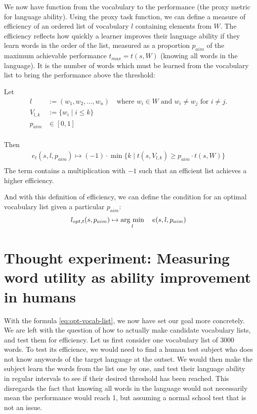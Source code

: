 We now have function from the vocabulary to the performance (the proxy metric for language ability).
Using the proxy task function, we can define a measure of efficiency of an ordered list of vocabulary $l$ containing elements from $W$.
The efficiency reflects how quickly a learner improves their language ability if they learn words in the order of the list, measured as a proportion $p_{aim}$ of the maximum achievable performance $t_{max} = t(s,W)$ (knowing all words in the language).
It is the number of words which must be learned from the vocabulary list to bring the performance above the threshold:

Let
\begin{align*}
	l & := (w_1, w_2, \dots, w_n) \quad \text{where } w_i \in W \text{ and } w_i \neq w_j \text{ for } i \neq j. \\
	V_{l, k} &:= \{w_i \mid i \leq k\}\\
	p_{aim} & \in  [0, 1] \\
\end{align*}

Then 
\begin{align*}
	e_{t}(s, l, p_{aim}) \mapsto ( -1 )  \cdot  \min\{ k \mid  t(s,  V_{l, k}) \geq p_{aim} \cdot t(s, W)\} \\
\end{align*}
The term contains a multiplication with $-1$ such that an efficient list achieves a higher efficiency.

And with this definition of efficiency, we can define the condition for an optimal vocabulary list given a particular $p_{aim}$:
\begin{align} \label{eq:opt-vocab-list}
	l_{opt, t} (s, p_{aim}) \mapsto \mathop{\rm arg~min}\limits_{l} \quad e(s, l, p_{aim}) \\
\end{align}



\section{Thought experiment: Measuring word utility as ability improvement in humans}


With the formula \ref{eq:opt-vocab-list}, we now have set our goal more concretely.
We are left with the question of how to actually make candidate vocabulary lists, and test them for efficiency.
Let us first consider one vocabulary list of 3000 words.
To test its efficience, we would need to find a human test subject who does not know anywords of the target language at the outset.
We would then make the subject learn the words from the list one by one, and test their language ability in regular intervals to see if their desired threshold has been reached.
This disregards the fact that knowing all words in the language would not necessarily mean the performance would reach 1, but assuming a normal school test that is not an issue.

